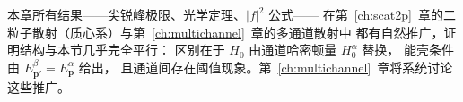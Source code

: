 \begin{remark}
本章所有结果——尖锐峰极限、光学定理、$|f|^2$ 公式——
在第~\ref{ch:scat2p}~章的二粒子散射（质心系）与第~\ref{ch:multichannel}~章的多通道散射中
都有自然推广，证明结构与本节几乎完全平行：
区别在于 $H_0$ 由通道哈密顿量 $H_0^\alpha$ 替换，
能壳条件由 $E_{\bm{p}'}^\beta = E_{\bm{p}}^\alpha$ 给出，
且通道间存在阈值现象。第~\ref{ch:multichannel}~章将系统讨论这些推广。
\end{remark}
